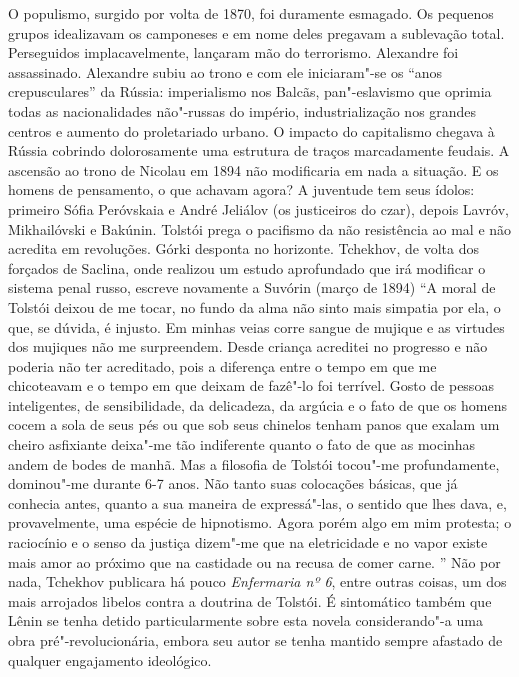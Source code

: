 O populismo, surgido por volta de 1870, foi duramente esmagado. Os
pequenos grupos idealizavam os camponeses e em nome deles pregavam a
sublevação total. Perseguidos implacavelmente, lançaram mão do
terrorismo. Alexandre  foi assassinado. Alexandre  subiu ao trono e
com ele iniciaram"-se os ``anos crepusculares'' da Rússia: imperialismo
nos Balcãs, pan"-eslavismo que oprimia todas as nacionalidades não"-russas
do império, industrialização nos grandes centros e aumento do
proletariado urbano. O impacto do capitalismo chegava à Rússia cobrindo
dolorosamente uma estrutura de traços marcadamente feudais. A ascensão
ao trono de Nicolau  em 1894 não modificaria em nada a situação. E os
homens de pensamento, o que achavam agora? A juventude tem seus ídolos:
primeiro Sófia Peróvskaia e André Jeliálov (os justiceiros do czar),
depois Lavróv, Mikhailóvski e Bakúnin. Tolstói prega o pacifismo da não
resistência ao mal e não acredita em revoluções. Górki desponta no
horizonte. Tchekhov, de volta dos forçados de Saclina, onde realizou um
estudo aprofundado que irá modificar o sistema penal russo, escreve
novamente a Suvórin (março de 1894) ``A moral de Tolstói deixou de me
tocar, no fundo da alma não sinto mais simpatia por ela, o que, se
dúvida, é injusto. Em minhas veias corre sangue de mujique e as virtudes
dos mujiques não me surpreendem. Desde criança acreditei no progresso e
não poderia não ter acreditado, pois a diferença entre o tempo em que me
chicoteavam e o tempo em que deixam de fazê"-lo foi terrível. Gosto de
pessoas inteligentes, de sensibilidade, da delicadeza, da argúcia e o
fato de que os homens cocem a sola de seus pés ou que sob seus chinelos
tenham panos que exalam um cheiro asfixiante deixa"-me tão indiferente
quanto o fato de que as mocinhas andem de bodes de manhã. Mas a
filosofia de Tolstói tocou"-me profundamente, dominou"-me durante 6-7
anos. Não tanto suas colocações básicas, que já conhecia antes, quanto a
sua maneira de expressá"-las, o sentido que lhes dava, e, provavelmente,
uma espécie de hipnotismo. Agora porém algo em mim protesta; o
raciocínio e o senso da justiça dizem"-me que na eletricidade e no vapor
existe mais amor ao próximo que na castidade ou na recusa de comer
carne. '' Não por nada, Tchekhov publicara há pouco \emph{Enfermaria nº
6}, entre outras coisas, um dos mais arrojados libelos contra a doutrina
de Tolstói. É sintomático também que Lênin se tenha detido
particularmente sobre esta novela considerando"-a uma obra
pré"-revolucionária, embora seu autor se tenha mantido sempre afastado de
qualquer engajamento ideológico.

